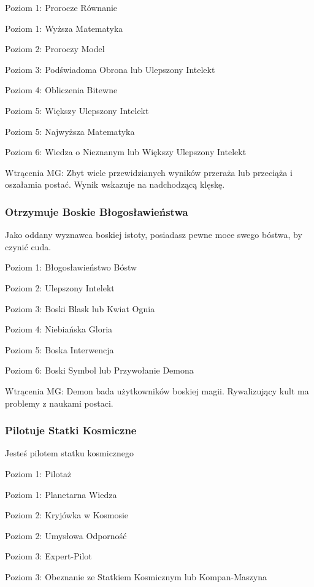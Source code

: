 Poziom 1: Prorocze Równanie

Poziom 1: Wyższa Matematyka

Poziom 2: Proroczy Model

Poziom 3: Podświadoma Obrona lub Ulepszony Intelekt

Poziom 4: Obliczenia Bitewne

Poziom 5: Większy Ulepszony Intelekt

Poziom 5: Najwyższa Matematyka

Poziom 6: Wiedza o Nieznanym lub Większy Ulepszony Intelekt 

Wtrącenia MG: Zbyt wiele przewidzianych wyników przeraża lub przeciąża i oszałamia postać. Wynik wskazuje na nadchodzącą klęskę. 

\subsubsection{Otrzymuje Boskie Błogosławieństwa}

Jako oddany wyznawca boskiej istoty, posiadasz pewne moce swego bóstwa, by czynić cuda. 

Poziom 1: Błogosławieństwo Bóstw

Poziom 2: Ulepszony Intelekt

Poziom 3: Boski Blask lub Kwiat Ognia

Poziom 4: Niebiańska Gloria

Poziom 5: Boska Interwencja

Poziom 6: Boski Symbol lub Przywołanie Demona

Wtrącenia MG: Demon bada użytkowników boskiej magii. Rywalizujący kult ma problemy z naukami postaci.

\subsubsection{Pilotuje Statki Kosmiczne}

Jesteś pilotem statku kosmicznego

Poziom 1: Pilotaż

Poziom 1: Planetarna Wiedza

Poziom 2: Kryjówka w Kosmosie

Poziom 2: Umysłowa Odporność

Poziom 3: Expert-Pilot

Poziom 3: Obeznanie ze Statkiem Kosmicznym lub Kompan-Maszyna

